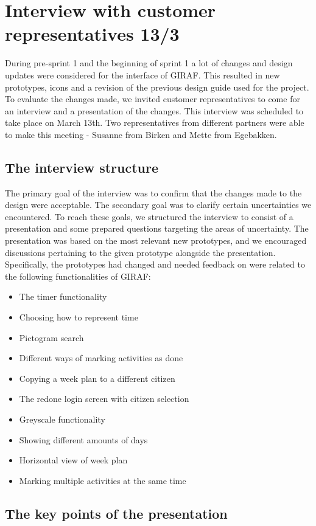 \section{Interview with customer representatives 13/3}\label{interview13/3}
During pre-sprint 1 and the beginning of sprint 1 a lot of changes and design updates were considered for the interface of GIRAF.
This resulted in new prototypes, icons and a revision of the previous design guide used for the project.
To evaluate the changes made, we invited customer representatives to come for an interview and a presentation of the changes.
This interview was scheduled to take place on March 13th.
Two representatives from different partners were able to make this meeting - Susanne from Birken and Mette from Egebakken.

\subsection{The interview structure}
The primary goal of the interview was to confirm that the changes made to the design were acceptable. 
The secondary goal was to clarify certain uncertainties we encountered. 
To reach these goals, we structured the interview to consist of a presentation and some prepared questions targeting the areas of uncertainty.
The presentation was based on the most relevant new prototypes, and we encouraged discussions pertaining to the given prototype alongside the presentation.
Specifically, the prototypes had changed and needed feedback on were related to the following functionalities of GIRAF:
\begin{itemize}
    \item The timer functionality
    \item Choosing how to represent time
    \item Pictogram search
    \item Different ways of marking activities as done
    \item Copying a week plan to a different citizen
    \item The redone login screen with citizen selection
    \item Greyscale functionality
    \item Showing different amounts of days
    \item Horizontal view of week plan
    \item Marking multiple activities at the same time
\end{itemize}

\subsection{The key points of the presentation}
